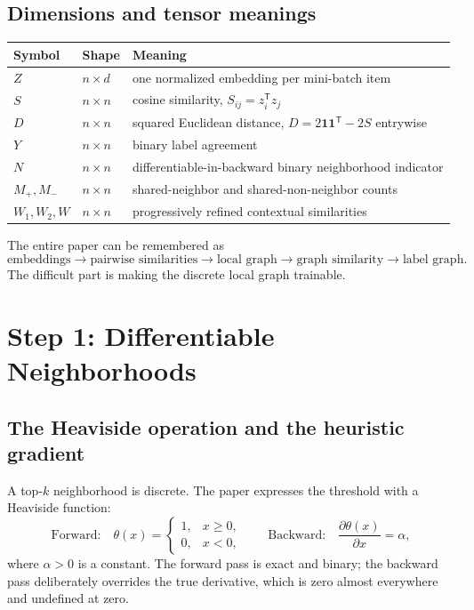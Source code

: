 \documentclass[11pt,oneside,openany]{book}
\theoremstyle{myplain}
\theoremstyle{definition}
\newcommand{\transpose}{\mathsf{T}}
\newcommand{\paperEq}[1]{\tag{P#1}}
\begin{document}
\section{Dimensions and tensor meanings}

\begin{center}
\begin{tabularx}{\textwidth}{>{\bfseries}l l X}
\toprule
Symbol & Shape & Meaning \\
\midrule
$Z$ & $n\times d$ & one normalized embedding per mini-batch item \\
$S$ & $n\times n$ & cosine similarity, $S_{ij}=z_i^\transpose z_j$ \\
$D$ & $n\times n$ & squared Euclidean distance, $D=2\mathbf 1\mathbf 1^\transpose-2S$ entrywise \\
$Y$ & $n\times n$ & binary label agreement \\
$N$ & $n\times n$ & differentiable-in-backward binary neighborhood indicator \\
$M_+,M_-$ & $n\times n$ & shared-neighbor and shared-non-neighbor counts \\
$W_1,W_2,W$ & $n\times n$ & progressively refined contextual similarities \\
\bottomrule
\end{tabularx}
\end{center}

\begin{conceptbox}[title=The conceptual compression]
The entire paper can be remembered as
\[
\boxed{\text{embeddings}\to\text{pairwise similarities}\to\text{local graph}\to\text{graph similarity}\to\text{label graph}.}
\]
The difficult part is making the discrete local graph trainable.
\end{conceptbox}

\chapter{Step 1: Differentiable Neighborhoods}
\label{chap:step1}

\section{The Heaviside operation and the heuristic gradient}

A top-$k$ neighborhood is discrete. The paper expresses the threshold with a Heaviside function:
\begin{equation*}
\text{Forward:}\quad
\theta(x)=\begin{cases}1,&x\ge 0,\\0,&x<0,\end{cases}
\qquad
\text{Backward:}\quad \frac{\partial\theta(x)}{\partial x}=\alpha,
\paperEq{1}
\label{eq:heaviside}
\end{equation*}
where $\alpha>0$ is a constant. The forward pass is exact and binary; the backward pass deliberately overrides the true derivative, which is zero almost everywhere and undefined at zero.
\end{document}
